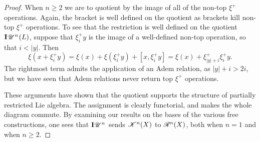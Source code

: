 \documentclass[11pt]{article}
\newcommand{\PRLie}[1]{\scrR^{#1}}%
\newcommand{\LL}[1]{{\scrK}^{#1}}%
\newcommand{\nontop}[1]{\scrU^{#1}}%
\newcommand{\restn}[1]{\xi{#1}}
\newcommand{\Ind}[2][]{\mathbf{I}{#2}_{#1}}%
\newcommand{\Fr}[1]{#1}%
\newcommand{\LambdaOp}{\xi^{+}}
\begin{document}
\begin{DiagramOfFunctors}
\begin{proof}
When $n\geq2$  we are to quotient by the image of all of the non-top $\LambdaOp$ operations. Again, the bracket is well defined on the quotient as brackets kill non-top $\LambdaOp$ operations. To see that the restriction is well defined on the quotient $\Ind{\nontop{n}}(L)$, %
suppose that $\LambdaOp_iy$ is the image of a well-defined non-top operation, so that $i<|y|$. Then
\[\restn{(x+\LambdaOp_iy)}=\restn{(x)}+\restn{(\LambdaOp_iy)}+[x,\LambdaOp_iy]=\restn{(x)}+\LambdaOp_{|y|+i}\LambdaOp_iy.\]
The rightmost term admits the application of an Adem relation, as $|y|+i>2i$, but we have seen that Adem relations never return top $\LambdaOp$ operations.

These arguments have shown that the quotient supports the structure of partially restricted Lie algebra. The assignment is clearly functorial, and makes the whole diagram commute. 
By examining our results on the bases of the various free constructions, one sees that $\Ind{\nontop{n}}$ sends $\Fr{\LL{n}}(X)$ to $\Fr{\PRLie{n}}(X)$, both when $n=1$ and when $n\geq2$.
\end{proof}



\end{DiagramOfFunctors}
\end{document}
